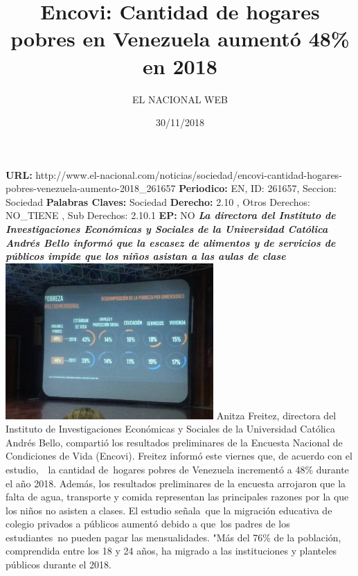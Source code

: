 \documentclass{article}%
\title{\textbf{Encovi: Cantidad de hogares pobres en Venezuela aumentó 48\% en 2018}}%
\author{EL NACIONAL WEB}%
\date{30/11/2018}%
\begin{document}
%
\normalsize%
\maketitle%
\textbf{URL: }%
http://www.el{-}nacional.com/noticias/sociedad/encovi{-}cantidad{-}hogares{-}pobres{-}venezuela{-}aumento{-}2018\_261657\newline%
%
\textbf{Periodico: }%
EN, %
ID: %
261657, %
Seccion: %
Sociedad\newline%
%
\textbf{Palabras Claves: }%
Sociedad\newline%
%
\textbf{Derecho: }%
2.10%
, Otros Derechos: %
NO\_TIENE%
, Sub Derechos: %
2.10.1%
\newline%
%
\textbf{EP: }%
NO\newline%
\newline%
%
\textbf{\textit{La directora del Instituto de Investigaciones Económicas y Sociales de la Universidad Católica Andrés Bello informó que la escasez de alimentos y de servicios de públicos impide que los niños asistan a las aulas de clase}}%
\newline%
\newline%
%
\includegraphics[width=300px]{40.jpg}%
\newline%
%
Anitza Freitez, directora del Instituto de Investigaciones Económicas y Sociales de la Universidad Católica Andrés Bello, compartió los resultados preliminares de la Encuesta Nacional de Condiciones de Vida (Encovi).%
\newline%
%
Freitez informó este viernes que, de acuerdo con el estudio,~~la cantidad de~hogares pobres de Venezuela incrementó a 48\% durante el año 2018.%
\newline%
%
Además, los resultados preliminares de la encuesta arrojaron que la falta de agua, transporte y comida representan las principales razones por la que los niños no asisten a clases.%
\newline%
%
El estudio señala~que la migración educativa de colegio privados a públicos aumentó debido a que~los padres de los estudiantes~no pueden pagar las mensualidades.%
\newline%
%
"Más del 76\% de la población, comprendida entre los 18 y 24 años, ha migrado a las instituciones y planteles públicos durante el 2018.%
\newline%
%
\end{document}
